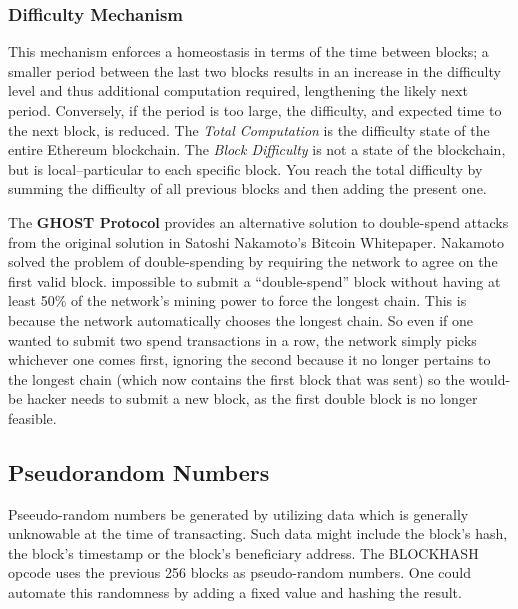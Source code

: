 \documentclass[10pt,a4paper,leqno,bibliography=totoc]{scrartcl}
\newenvironment{alphafootnotes}
{\par\edef\savedfootnotenumber{\number\value{footnote}}
\renewcommand{\thefootnote}{\alph{footnote}}
\setcounter{footnote}{0}}
{\par\setcounter{footnote}{\savedfootnotenumber}}
\begin{document}
\begin{alphafootnotes}
\begin{multicols*}{2}
		\subsubsection{Difficulty Mechanism}
			This mechanism enforces a homeostasis in terms of the time between blocks; a smaller period between the last two blocks results in an increase in the difficulty level and thus additional computation required, lengthening the likely next period. Conversely, if the period is too large, the difficulty, and expected time to the next block, is reduced. The \textit{Total Computation} is the difficulty state of the entire Ethereum blockchain. The \textit{Block Difficulty} is not a state of the blockchain, but is local--particular to each specific block. You reach the total difficulty by summing the difficulty of all previous blocks and then adding the present one.  \par
			The \textbf{GHOST Protocol} provides an alternative solution to double-spend attacks from the original solution in Satoshi Nakamoto's Bitcoin Whitepaper. Nakamoto solved the problem of double-spending by requiring the network to agree on the first valid block.  impossible to submit a ``double-spend''  block without  having at least 50\% of the network's mining power to force the longest chain. This is because the network automatically chooses the longest chain. So even if one wanted to  submit two spend transactions in a row, the network simply picks whichever one comes first, ignoring the second because it no longer pertains to the longest chain (which now contains the first block that was sent) so the would-be hacker needs to submit a new block, as the first double block is no longer feasible.\par
		\subsection{Pseudorandom Numbers} Pseeudo-random numbers be generated by utilizing data which is generally unknowable at the time of transacting. Such data might include the block’s hash, the block’s timestamp or the block’s beneficiary address. The BLOCKHASH opcode uses the previous 256 blocks as pseudo-random numbers. One could automate this randomness by adding a fixed value and hashing the result.   

\end{multicols*}
\end{alphafootnotes}
\end{document}
